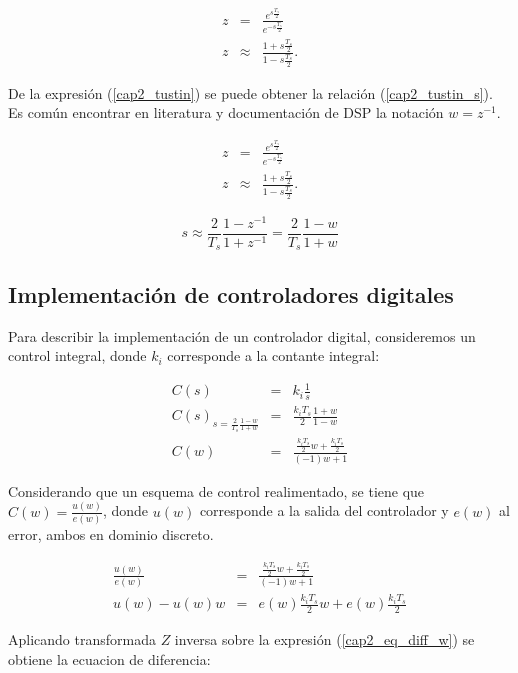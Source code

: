 \begin{eqnarray}
z &=& \frac{e^{s \frac{T_s}{2}}}{e^{-s \frac{T_s}{2}}}\\
z &\approx& \frac{1+s \frac{T_s}{2}}{1-s \frac{T_s}{2}} \label{cap2_tustin}.
\end{eqnarray}

De la expresión (\ref{cap2_tustin}) se puede obtener la relación (\ref{cap2_tustin_s}). Es común encontrar en literatura y documentación de DSP la notación $w=z^{-1}$.

\begin{eqnarray}
z &=& \frac{e^{s \frac{T_s}{2}}}{e^{-s \frac{T_s}{2}}}\\
z &\approx& \frac{1+s \frac{T_s}{2}}{1-s \frac{T_s}{2}} \label{cap2_tustin}.
\end{eqnarray}

\begin{equation}\label{cap2_tustin_s}
s \approx \frac{2}{T_s} \frac{1-z^{-1}}{1+z^{-1}} = \frac{2}{T_s} \frac{1-w}{1+w}
\end{equation}

\subsection{Implementación de controladores digitales}

Para describir la implementación de un controlador digital, consideremos un control integral, donde $k_i$ corresponde a la contante integral:

\begin{eqnarray}
C(s) &=& k_i \frac{1}{s}\\
C(s)_{s=\frac{2}{T_s} \frac{1-w}{1+w}} &=& \frac{k_i T_s}{2} \frac{1+w}{1-w} \\
C(w) &=& \frac{  \frac{k_i T_s}{2} w +  \frac{k_i T_s}{2} }{(-1)w+1} 
\end{eqnarray}

Considerando que un esquema de control realimentado, se tiene que $C(w) = \frac{u(w)}{e(w)}$, donde $u(w)$ corresponde a la salida del controlador y $e(w)$ al error, ambos en dominio discreto.

\begin{eqnarray}
\frac{u(w)}{e(w)} &=& \frac{  \frac{k_i T_s}{2} w +  \frac{k_i T_s}{2} }{(-1)w+1} \\
u(w)-u(w)w &=& e(w) \frac{k_i T_s}{2} w +  e(w) \frac{k_i T_s}{2} \label{cap2_eq_diff_w}
\end{eqnarray}

Aplicando transformada $Z$ inversa sobre la expresión (\ref{cap2_eq_diff_w}) se obtiene la ecuacion de diferencia:

